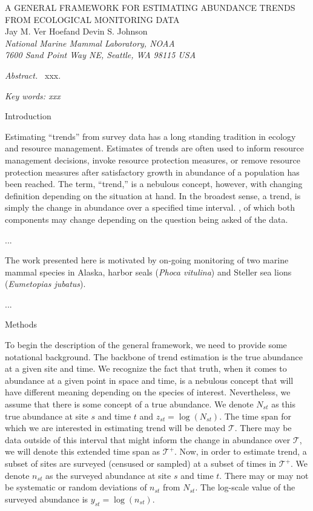 \documentclass[12pt,letter]{article}
\newcommand{\Nst}{\ensuremath{N_{st}}}
\newcommand{\nst}{\ensuremath{n_{st}}}
\newcommand{\zst}{\ensuremath{z_{st}}}
\newcommand{\yst}{\ensuremath{y_{st}}}
\newcommand{\fT}{\ensuremath{\mathcal{T}}}
\newcommand{\fTp}{\ensuremath{\mathcal{T}^+}}
\begin{document}
\begin{center}
\Large A GENERAL FRAMEWORK FOR ESTIMATING ABUNDANCE TRENDS FROM ECOLOGICAL MONITORING DATA
\bigskip\\
\normalsize
{\sc Jay M. Ver Hoef\footnotemark[1] and Devin S. Johnson}\smallskip\\
{\em National Marine Mammal Laboratory, NOAA\\
7600 Sand Point Way NE, Seattle,
WA 98115 USA }\\ \medskip
\end{center}

\raggedright \setlength{\parindent}{0.3in}
\renewcommand{\baselinestretch}{1.7}\normalsize
{}
 \linenumbers

{\em Abstract.\ } xxx.

{\em Key words: xxx}

\centerline{\sc Introduction}

Estimating ``trends'' from survey data has a long standing tradition in ecology and resource management. Estimates of trends are often used to inform resource management decisions, invoke resource protection measures, or remove resource protection measures after satisfactory growth in abundance of a population has been reached. The term, ``trend,'' is a nebulous concept, however, with changing definition depending on the situation at hand. In the broadest sense, a trend, is simply the change in abundance over a specified time interval. , of which both components may change depending on the question being asked of the data.   

...

The work presented here is motivated by on-going monitoring of two marine mammal species in Alaska, harbor seals ({\it Phoca vitulina}) and Steller sea lions ({\it Eumetopias jubatus}).

...
   
\centerline{\sc Methods}

To begin the description of the general framework, we need to provide some notational background. The backbone of trend estimation is the true abundance at a given site and time. We recognize the fact that truth, when it comes to abundance at a given point in space and time, is a nebulous concept that will have different meaning depending on the species of interest. Nevertheless, we assume that there is some concept of a true abundance. We denote $\Nst$ as this true abundance at site $s$ and time $t$ and $\zst=\log(\Nst)$. The time span for which we are interested in estimating trend will be denoted $\fT$. There may be data outside of this interval that might inform the change in abundance over $\fT$, we will denote this extended time span as $\fTp$. Now, in order to estimate trend, a subset of sites are surveyed (censused or sampled) at a subset of times in $\fTp$. We denote $\nst$ as the surveyed abundance at site $s$ and time $t$. There may or may not be systematic or random deviations of $\nst$ from $\Nst$. The log-scale value of the surveyed abundance is $\yst=\log(\nst)$.  
\end{document}
